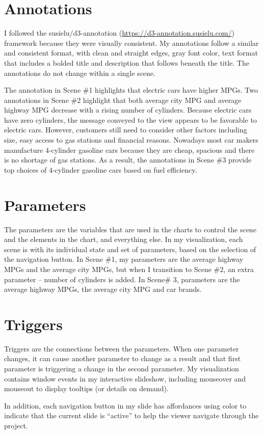 \documentclass[11pt]{article}
\begin{document}
\begin{enumerate}
\end{enumerate}

\section{Annotations}
I followed the susielu/d3-annotation (\url{https://d3-annotation.susielu.com/}) framework because they were visually consistent. My annotations follow a similar and consistent format, with clean and straight edges, gray font color, text format that includes a bolded title and description that follows beneath the title.
The annotations do not change within a single scene.

The annotation in Scene \#1 highlights that electric cars have higher MPGs. Two annotations in Scene \#2 highlight that both average city MPG and average highway MPG decrease with a rising number of cylinders. Because electric cars have zero cylinders, the message conveyed to the view appears to be favorable to electric cars. However,  customers still need to consider other factors including size, easy access to gas stations and financial reasons. Nowadays most car makers manufacture 4-cylinder gasoline cars because they are cheap, spacious and there is no shortage of gas stations. As a result, the annotations in Scene \#3 provide top choices of 4-cylinder gasoline cars based on fuel efficiency.

\section{Parameters}
The parameters are the variables that are used in the charts to control the scene and the elements in the chart, and everything else. In my visualization, each scene is with its individual state and set of parameters, based on the selection of the navigation button. In Scene \#1, my parameters are the average highway MPGs and the average city MPGs, but when I transition to Scene \#2,  an extra parameter -- number of cylinders is added. In Scene\# 3, parameters are the average highway MPGs, the average city MPG and car brands. 

\section{Triggers}
Triggers are the connections between the parameters. When one parameter changes, it can cause another parameter to change as a result and that first parameter is triggering a change in the second parameter. My visualization contains window events in my interactive slideshow, including mouseover and mouseout to display tooltips (or details on demand). 

In addition, each navigation button in my slide has affordances using color to indicate that the current slide is “active” to help the viewer navigate through the project.
\end{document}
